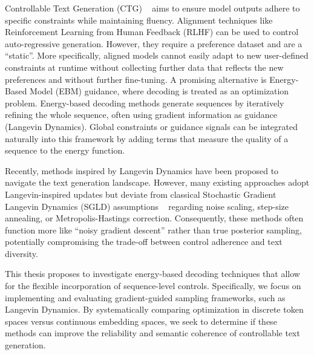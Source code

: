 \documentclass[11pt]{article}
\begin{document}

Controllable Text Generation (CTG) ~\cite{hu2018controlledgenerationtext, zhang2023surveycontrollabletextgeneration} aims to ensure model outputs adhere to specific constraints while maintaining fluency. Alignment techniques like Reinforcement Learning from Human Feedback (RLHF) can be used to control auto-regressive generation. However, they require a preference dataset and are a ``static''. More specifically, aligned models cannot easily adapt to new user-defined constraints at runtime without collecting further data that reflects the new preferences and without further fine-tuning. A promising alternative is Energy-Based Model (EBM) guidance, where decoding is treated as an optimization problem. Energy-based decoding methods generate sequences by iteratively refining the whole sequence, often using gradient information as guidance (Langevin Dynamics). Global constraints or guidance signals can be integrated naturally into this framework by adding terms that measure the quality of a sequence to the energy function.

Recently, methods inspired by Langevin Dynamics have been proposed to navigate the text generation landscape. However, many existing approaches adopt Langevin-inspired updates but deviate from classical Stochastic Gradient Langevin Dynamics (SGLD) assumptions ~\cite{10.5555/3104482.3104568} regarding noise scaling, step-size annealing, or Metropolis-Hastings correction. Consequently, these methods often function more like ``noisy gradient descent'' rather than true posterior sampling, potentially compromising the trade-off between control adherence and text diversity.


This thesis proposes to investigate energy-based decoding techniques that allow for the flexible incorporation of sequence-level controls. Specifically, we focus on implementing and evaluating gradient-guided sampling frameworks, such as Langevin Dynamics. By systematically comparing optimization in discrete token spaces versus continuous embedding spaces, we seek to determine if these methods can improve the reliability and semantic coherence of controllable text generation.
\end{document}
